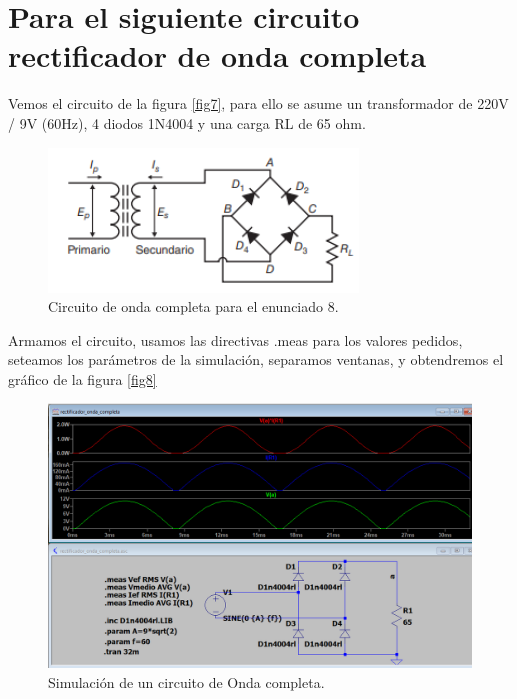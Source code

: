 \documentclass[a4paper]{article} %
\begin{document}
\section{Para el siguiente circuito rectificador de onda completa}

Vemos el circuito de la figura \eqref{fig7}, para ello se asume un transformador de 220V / 9V (60Hz), 4 diodos 1N4004 y una carga RL de 65 ohm.

\begin{figure} %
	\centering %
	\includegraphics[scale=0.8]{IMAGENES/fig7} %
	\caption{Circuito de onda completa para el enunciado 8.} %
	\label{fig7} %
\end{figure} %

Armamos el circuito, usamos las directivas .meas para los valores pedidos, seteamos los parámetros de la simulación, separamos ventanas, y obtendremos el gráfico de la figura \eqref{fig8}

\begin{figure} %
	\centering %
	\includegraphics[scale=0.5]{IMAGENES/fig8} %
	\caption{Simulación de un circuito de Onda completa.} %
	\label{fig8} %
\end{figure} %
\end{document}
